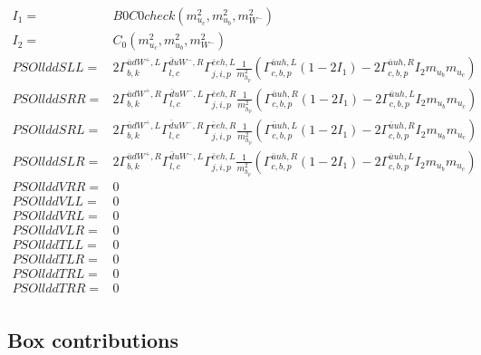 \documentclass[A4,landscape]{article}
\begin{document}
\begin{align} 
I_1= & B0C0check(m^2_{u_{{c}}}, m^2_{u_{{b}}}, m^2_{W^-}) \\ 
I_2= & C_0(m^2_{u_{{c}}}, m^2_{u_{{b}}}, m^2_{W^-}) \\ 
  PSOllddSLL= & 2  \Gamma^{\bar{u}d W^+,L}_{b, k} \Gamma^{\bar{d}u W^- ,R}_{l, c} \Gamma^{\bar{e}e h ,L}_{j, i, p} \frac{1}{m^2_{h_{{p}}}} (\Gamma^{\bar{u}u h ,L}_{c, b, p} (1 - 2 I_1) - 2 \Gamma^{\bar{u}u h ,R}_{c, b, p} I_2 m_{u_{{b}}} m_{u_{{c}}}) \\ 
  PSOllddSRR= & 2  \Gamma^{\bar{u}d W^+,R}_{b, k} \Gamma^{\bar{d}u W^- ,L}_{l, c} \Gamma^{\bar{e}e h ,R}_{j, i, p} \frac{1}{m^2_{h_{{p}}}} (\Gamma^{\bar{u}u h ,R}_{c, b, p} (1 - 2 I_1) - 2 \Gamma^{\bar{u}u h ,L}_{c, b, p} I_2 m_{u_{{b}}} m_{u_{{c}}}) \\ 
  PSOllddSRL= & 2  \Gamma^{\bar{u}d W^+,L}_{b, k} \Gamma^{\bar{d}u W^- ,R}_{l, c} \Gamma^{\bar{e}e h ,R}_{j, i, p} \frac{1}{m^2_{h_{{p}}}} (\Gamma^{\bar{u}u h ,L}_{c, b, p} (1 - 2 I_1) - 2 \Gamma^{\bar{u}u h ,R}_{c, b, p} I_2 m_{u_{{b}}} m_{u_{{c}}}) \\ 
  PSOllddSLR= & 2  \Gamma^{\bar{u}d W^+,R}_{b, k} \Gamma^{\bar{d}u W^- ,L}_{l, c} \Gamma^{\bar{e}e h ,L}_{j, i, p} \frac{1}{m^2_{h_{{p}}}} (\Gamma^{\bar{u}u h ,R}_{c, b, p} (1 - 2 I_1) - 2 \Gamma^{\bar{u}u h ,L}_{c, b, p} I_2 m_{u_{{b}}} m_{u_{{c}}}) \\ 
  PSOllddVRR= & 0 \\ 
  PSOllddVLL= & 0 \\ 
  PSOllddVRL= & 0 \\ 
  PSOllddVLR= & 0 \\ 
  PSOllddTLL= & 0 \\ 
  PSOllddTLR= & 0 \\ 
  PSOllddTRL= & 0 \\ 
  PSOllddTRR= & 0 \\ 
\end{align} 
\subsection{Box contributions} 
\end{document}
